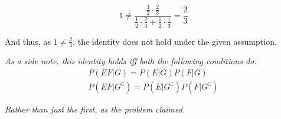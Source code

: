 \documentclass{article}
\begin{document}
\begin{equation*}
    1\not=\frac{\frac{1}{2}\cdot\frac{2}{3}}{\frac{1}{2}\cdot\frac{2}{3}+\frac{1}{2}\cdot\frac{1}{3}}=\frac{2}{3}
\end{equation*}

And thus, as $1\not = \frac{2}{3}$, the identity does not hold under the given assumption.
\bigskip

\textit{As a side note, this identity holds iff both the following conditions do:}
\begin{gather*}
    P(EF|G)=P(E|G)P(F|G)\\
    P(EF|G^\complement)=P(E|G^\complement)P(F|G^\complement)
\end{gather*}

\textit{Rather than just the first, as the problem claimed.}
\end{document}
